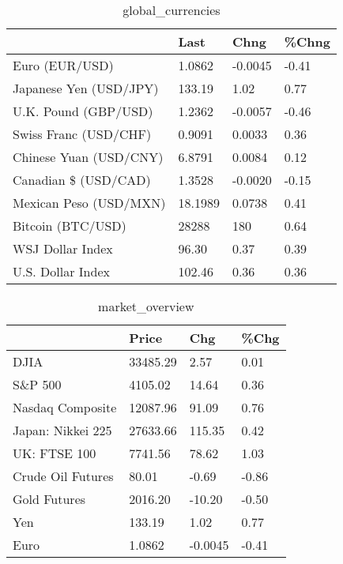 \documentclass{article}%
\begin{document}
%


\begin{table}[htbp]%
\caption{global\_currencies}%
\centering%
\begin{adjustbox}{width=1\textwidth}%
\begin{tabular}{llll}
\toprule
                       &    Last &    Chng & \%Chng \\
\midrule
        Euro (EUR/USD) &  1.0862 & -0.0045 & -0.41 \\
Japanese Yen (USD/JPY) &  133.19 &    1.02 &  0.77 \\
  U.K. Pound (GBP/USD) &  1.2362 & -0.0057 & -0.46 \\
 Swiss Franc (USD/CHF) &  0.9091 &  0.0033 &  0.36 \\
Chinese Yuan (USD/CNY) &  6.8791 &  0.0084 &  0.12 \\
  Canadian \$ (USD/CAD) &  1.3528 & -0.0020 & -0.15 \\
Mexican Peso (USD/MXN) & 18.1989 &  0.0738 &  0.41 \\
     Bitcoin (BTC/USD) &   28288 &     180 &  0.64 \\
      WSJ Dollar Index &   96.30 &    0.37 &  0.39 \\
     U.S. Dollar Index &  102.46 &    0.36 &  0.36 \\
\bottomrule
\end{tabular}
%
\end{adjustbox}%
\end{table}

%


\begin{table}[htbp]%
\caption{market\_overview}%
\centering%
\begin{adjustbox}{width=1\textwidth}%
\begin{tabular}{llll}
\toprule
                  &    Price &     Chg &  \%Chg \\
\midrule
             DJIA & 33485.29 &    2.57 &  0.01 \\
          S\&P 500 &  4105.02 &   14.64 &  0.36 \\
 Nasdaq Composite & 12087.96 &   91.09 &  0.76 \\
Japan: Nikkei 225 & 27633.66 &  115.35 &  0.42 \\
     UK: FTSE 100 &  7741.56 &   78.62 &  1.03 \\
Crude Oil Futures &    80.01 &   -0.69 & -0.86 \\
     Gold Futures &  2016.20 &  -10.20 & -0.50 \\
              Yen &   133.19 &    1.02 &  0.77 \\
             Euro &   1.0862 & -0.0045 & -0.41 \\
\bottomrule
\end{tabular}
%
\end{adjustbox}%
\end{table}

%
\end{document}
